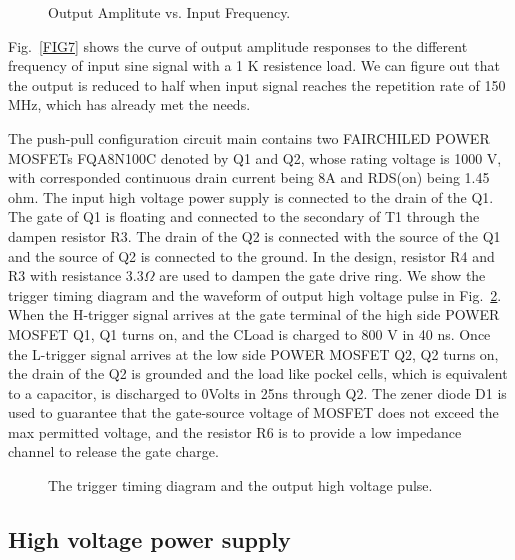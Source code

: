 \documentclass[aip,rsi,reprint,graphicx]{revtex4-1} %
\begin{document}
\begin{figure}
{}  
  \caption{Output Amplitute vs. Input Frequency.\label{FIG8}}
\end{figure}

 Fig.~\ref{FIG7} shows the curve of output amplitude responses to the different frequency of input sine signal with a 1 K resistence load.
 We can figure out that the output is reduced to half when input signal reaches the repetition rate of 150 MHz, which has already met the needs.


The push-pull configuration circuit main contains two FAIRCHILED POWER MOSFETs FQA8N100C denoted by Q1 and Q2, whose rating voltage is 1000 V, with corresponded continuous drain current being 8A and RDS(on) being 1.45 ohm.
The input high voltage power supply is connected to the drain of the Q1. The gate of Q1 is floating and connected to the secondary of T1 through the dampen resistor R3. 
The drain of the Q2 is connected with the source of the Q1 and the source of Q2 is connected to the ground. 
In the design, resistor R4 and R3 with resistance $3.3 \Omega$ are used to dampen the gate drive ring.
We show the trigger timing diagram and the waveform of output high voltage pulse in Fig.~\ref{FIG2}. 
When the H-trigger signal arrives at the gate terminal of the high side POWER MOSFET Q1, Q1 turns on, and the CLoad is charged to 800 V in 40 ns. 
Once the L-trigger signal arrives at the low side POWER MOSFET Q2, Q2 turns on, the drain of the Q2 is grounded and the load like pockel cells, which is equivalent to a capacitor, is discharged to 0Volts in 25ns through Q2. 
The zener diode D1 is used to guarantee that the gate-source voltage of MOSFET does not exceed the max permitted voltage, and the resistor R6 is to provide a low impedance channel to release the gate charge.
\begin{figure}
\caption{The trigger timing diagram and the output high voltage pulse. \label{FIG2}}%
\end{figure}

\subsection{High voltage power supply}
\end{document}
